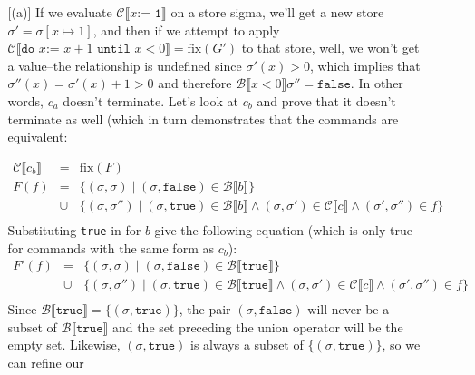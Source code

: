 \documentclass[10pt, oneside]{article}
\begin{document}
\begin{enumerate}[1.]
\begin{enumerate} [(a)]
			If we evaluate $\mathcal{C} \llbracket x \texttt{:= 1} \rrbracket$ on a store
			sigma, we'll get a new store $\sigma' = \sigma[x\mapsto 1]$, and then if we 
			attempt to apply  $\mathcal{C} \llbracket \texttt{do } x \texttt{:= } x + 1 
			\texttt{ until } x < 0 \rrbracket  =  \text{fix}(G')$ to that store, well, 
			we won't get a value--the relationship is undefined since $\sigma'(x) > 
			0$, which implies that $\sigma''(x) = \sigma'(x) + 1 > 0$ and therefore $
			\mathcal{B}\llbracket x < 0 \rrbracket \sigma'' = \texttt{false}$. In other 
			words, $c_a$ doesn't terminate. Let's look at $c_b$ and prove that it doesn't 
			terminate as well (which in turn demonstrates that the commands are 
			equivalent:
			
      \begin{eqnarray*}
        \mathcal{C} \llbracket c_b \rrbracket & = & \text{fix}(F) \\
        F(f) & = & \{ (\sigma, \sigma) \mid (\sigma, \texttt{false}) \in 
                                           \mathcal{B} \llbracket b \rrbracket \}\\
            & \cup & \{(\sigma, \sigma'') 
               \mid (\sigma, \texttt{true}) \in \mathcal{B} \llbracket b\rrbracket
             \wedge (\sigma, \sigma') \in \mathcal{C} \llbracket c \rrbracket 
             \wedge (\sigma', \sigma'') \in f \} \\
      \end{eqnarray*}
      Substituting \texttt{true} in for $b$ give the following equation (which is 
      only true for commands with the same form as $c_b$):
      \begin{eqnarray*}
        F'(f) & = & \{ (\sigma, \sigma) \mid (\sigma, \texttt{false}) \in 
                               \mathcal{B} \llbracket \texttt{true} \rrbracket \}\\
            & \cup & \{(\sigma, \sigma'') 
    \mid (\sigma, \texttt{true}) \in \mathcal{B} \llbracket \texttt{true}\rrbracket
             \wedge (\sigma, \sigma') \in \mathcal{C} \llbracket c \rrbracket 
             \wedge (\sigma', \sigma'') \in f \} \\
      \end{eqnarray*} 
      Since $\mathcal{B} \llbracket \texttt{true} \rrbracket = \{(\sigma, 
      \texttt{true})\}$, the pair $(\sigma, \texttt{false})$ will never be a subset 
      of $\mathcal{B} \llbracket \texttt{true} \rrbracket$ and the set preceding 
      the union operator will be the empty set. Likewise, $(\sigma, \texttt{true})$ 
      is always a subset of $\{(\sigma, \texttt{true})\}$, so we can refine our 

\end{enumerate}
\end{enumerate}
\end{document}
